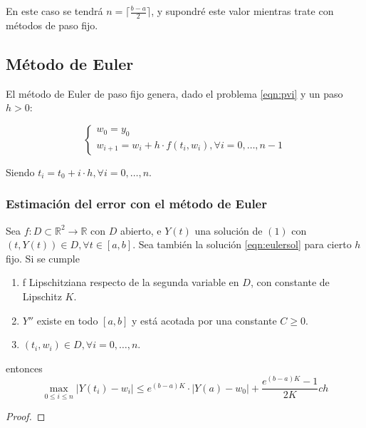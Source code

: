 En este caso se tendrá $n=\lceil \frac{b-a}{2} \rceil$, y supondré este valor mientras trate con métodos de paso fijo.

\subsection{Método de Euler}
\begin{definition} 
    El método de Euler de paso fijo genera, dado el problema \ref{eqn:pvi} y un paso $h>0$:

\begin{equation} \label{eqn:eulersol}
\begin{cases}
    w_0=y_0 \\
    w_{i+1}=w_i + h\cdot f(t_i, w_i), \forall i=0,\dots, n-1
\end{cases}
\end{equation}

Siendo $t_i =t_0+i\cdot h,\forall i=0,\dots, n$.
\end{definition}

\subsubsection{Estimación del error con el método de Euler}

\begin{theorem}
    Sea $f:D\subset \mathbb{R}^2\rightarrow \mathbb{R}$ con $D$ abierto, e $Y(t)$ una solución de $(1)$ con $(t,Y(t))\in D,\forall t\in[a,b]$. Sea también la solución \ref{eqn:eulersol} para cierto $h$ fijo. Si se cumple
    \begin{enumerate}[label=(\alph*)]
        \item f Lipschitziana respecto de la segunda variable en $D$, con constante de Lipschitz $K$.
        \item $Y''$ existe en todo $[a,b]$ y está acotada por una constante $C\geq 0$.
        \item $(t_i,w_i)\in D,\forall i=0,\dots,n$.
    \end{enumerate}
    entonces $$\max_{0\leq i \leq n}|Y(t_i)-w_i| \leq e^{(b-a)K}\cdot |Y(a)-w_0| + \frac{e^{(b-a)K}-1}{2K}ch$$

\end{theorem}
\begin{proof}
\end{proof}

